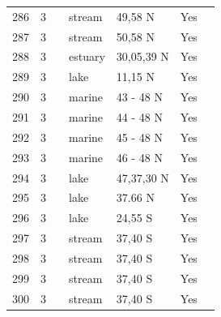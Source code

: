\documentclass[12pt]{article}
\begin{document}
\begin{landscape}
\begin{table}[h!]
{\begin{tabular}{p{2.8cm}p{1.3cm}p{3cm}p{2.2cm}p{2.5cm}lp{8.2cm}}
        286   & 3 & \cite{Cromar1996}  & stream & 49,58 N & Yes   &       \\
        287   & 3 & \cite{Cromar1996}  & stream & 50,58 N & Yes   &       \\
        288   & 3 & \cite{Christian1999}    & estuary & 30,05,39 N & Yes   &       \\
        289   & 3 & \cite{Fetahi2011}  & lake  & 11,15 N & Yes   &       \\
        290   & 3 & \cite{Brodeur1992}    & marine & 43 - 48 N & Yes   &       \\
        291   & 3 & \cite{Brodeur1992}    & marine & 44 - 48 N & Yes   &       \\
        292   & 3 & \cite{Brodeur1992}    & marine & 45 - 48 N & Yes   &       \\
        293   & 3 & \cite{Brodeur1992}    & marine & 46 - 48 N & Yes   &       \\
        294   & 3 & \cite{Gaedke1994}  & lake  & 47,37,30 N & Yes   &       \\
        295   & 3 & \cite{Preston2012}    & lake  & 37.66 N & Yes   &        \\
        296   & 3 & \cite{Ratsirarson1996}  & lake  & 24,55 S & Yes   &       \\
        297   & 3 & \cite{Closs1994}  & stream & 37,40 S & Yes   &       \\
        298   & 3 & \cite{Closs1994}  & stream & 37,40 S & Yes   &       \\
        299   & 3 & \cite{Closs1994}  & stream & 37,40 S & Yes   &       \\
        300   & 3 & \cite{Closs1994}  & stream & 37,40 S & Yes   &       \\
         \hline
      \end{tabular}}%
      \end{table}

        \newpage


\end{landscape}
\end{document}
